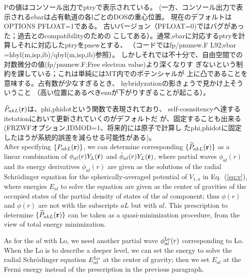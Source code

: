 \documentclass[twocolumn,showpacs,preprintnumbers,amsmath,amssymb,floatfix]{revtex4-1}
\newcommand{\bfr}{{\bf r}}
\def\phidot{\dot{\phi}}
\newcommand{\req}[1]{\mbox{Eq.~\!(\ref{#1})}}
\def\PakL{P_{akL}}
\def\wPakL{\widetilde{P}_{akL}}
\begin{document}
Pの値はコンソール出力でptryで表示されている。
(一方、コンソール出力で表示されるebarは占有軌道の各lごとのDOSの重心位置。
現在のデフォルトはOPTIONS PFLOAT=1である。
古いバージョン（PFLOAT=0)ではバグがあった；過去とのcompatibilityのための
こしてある）。通常,ebarに対応するptryを計算しそれに対応したptryをpnewとする、
（コードではfp/pnunew.F L92;ebar =hbyl(m,isp,ib)/qbyl(m,isp,ib)参照）。
しかしそれでは不十分で、自由空間での対数微分の値(fp/pnunew.F;Free electron value)より深くなりす
ぎないという制約を課している；これは単純にはMT内でのポテンシャルが
上に凸であることを意味する。占有数が少なすぎるとき、
hybridyzationの影きょうで見かけ上そういうこと
（高い位置にあるべきenuが下がりすぎることが起こる）。


$\tilde{P}_{akL}(\bfr)$は、phi,phidotという関数で表現されており、
self-cosnsitencyへ達するitetationにおいて更新されていくのがデフォルトだ
が、固定することも出来る(FRZWFオプション,IDMOD=1、将来的には原子で計算し
たphi,phidotに固定したほうが系統的誤差を減らせる可能性がある)。\\

After specifying $\{\PakL(\bfr) \}$, we can determine corresponding
$\{\wPakL(\bfr) \}$ as a linear combination of
$\phi_{al}(r)Y_L(\hat{\bfr})$ and $\phidot_{al}(r)Y_L(\hat{\bfr})$,
where partial waves $\phi_{al}(r)$ and its energy derivatives
$\phidot_{al}(r)$ are given as the solutions of the radial Schr\"odinger
equation for the spherically-averaged potential of $V_{1,a}$ in
\req{eq:v}, where energies $E_{al}$ to solve the equation are given as
the center of gravities of the occupied states of the partial density of
states of the $al$ component; thus 
$\phi(r)$ and $\phidot(r)$ are not with the subscripts $aL$ but with $al$.
This prescription to determine $\{\wPakL(\bfr) \}$ can be taken as a
quasi-minimization procedure, from the view of total energy
minimization.

As for the $al$ with Lo, we need another partial wave $\phi^{\rm
Lo}_{al}(r)$ corresponding to Lo.  When the Lo is to describe a deeper
level, we can set the energy to solve the radial Schr\"odinger equation
$E^{\rm Lo}_{al}$ at the center of gravity; then we set $E_{al}$ at the
Fermi energy instead of the prescription in the previous paragraph.
\end{document}
